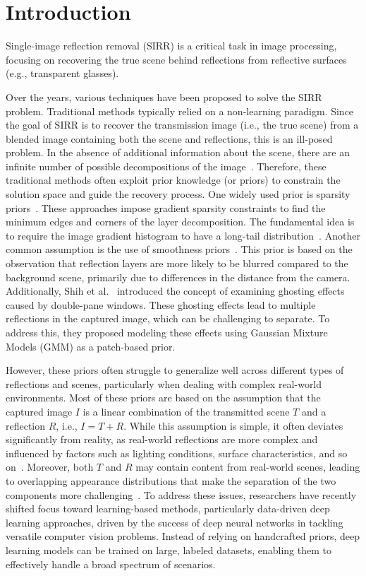 \section{Introduction}
\label{sec:intro}
Single-image reflection removal (SIRR) is a critical task in image processing, focusing on recovering the true scene behind reflections from reflective surfaces (e.g., transparent glasses). 

Over the years, various techniques have been proposed to solve the SIRR problem. Traditional methods typically relied on a non-learning paradigm. Since the goal of SIRR is to recover the transmission image (i.e., the true scene) from a blended image containing both the scene and reflections, this is an ill-posed problem. In the absence of additional information about the scene, there are an infinite number of possible decompositions of the image~\cite{levin2004separating}. Therefore, these traditional methods often exploit prior knowledge (or priors) to constrain the solution space and guide the recovery process. One widely used prior is sparsity priors~\cite{levin2002learning, levin2007user}. These approaches impose gradient sparsity constraints to find the minimum edges and corners of the layer decomposition. The fundamental idea is to require the image gradient histogram to have a long-tail distribution~\cite{li2014single}. Another common assumption is the use of smoothness priors~\cite{li2014single, yang2019fast, wan2016depth}. This prior is based on the observation that reflection layers are more likely to be blurred compared to the background scene, primarily due to differences in the distance from the camera. Additionally, Shih et al.~\cite{shih2015reflection} introduced the concept of examining ghosting effects caused by double-pane windows. These ghosting effects lead to multiple reflections in the captured image, which can be challenging to separate. To address this, they proposed modeling these effects using Gaussian Mixture Models (GMM) as a patch-based prior.

However, these priors often struggle to generalize well across different types of reflections and scenes, particularly when dealing with complex real-world environments. Most of these priors are based on the assumption that the captured image $I$ is a linear combination of the transmitted scene $T$ and a reflection $R$, i.e., $I = T + R$. While this assumption is simple, it often deviates significantly from reality, as real-world reflections are more complex and influenced by factors such as lighting conditions, surface characteristics, and so on~\cite{song2023robust}. Moreover, both $T$ and $R$ may contain content from real-world scenes, leading to overlapping appearance distributions that make the separation of the two components more challenging~\cite{wei2019single}. To address these issues, researchers have recently shifted focus toward learning-based methods, particularly data-driven deep learning approaches, driven by the success of deep neural networks in tackling versatile computer vision problems. Instead of relying on handcrafted priors, deep learning models can be trained on large, labeled datasets, enabling them to effectively handle a broad spectrum of scenarios. 

